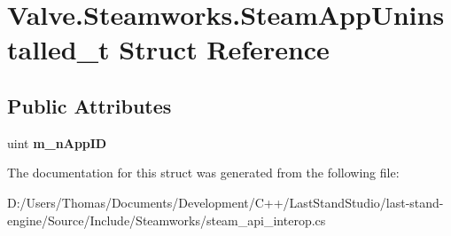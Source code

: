 \hypertarget{structValve_1_1Steamworks_1_1SteamAppUninstalled__t}{}\section{Valve.\+Steamworks.\+Steam\+App\+Uninstalled\+\_\+t Struct Reference}
\label{structValve_1_1Steamworks_1_1SteamAppUninstalled__t}
\subsection*{Public Attributes}
\begin{DoxyCompactItemize}
\item 
\hypertarget{structValve_1_1Steamworks_1_1SteamAppUninstalled__t_ae9404e738915edd6c6f46c6758af19bf}{}uint {\bfseries m\+\_\+n\+App\+I\+D}\label{structValve_1_1Steamworks_1_1SteamAppUninstalled__t_ae9404e738915edd6c6f46c6758af19bf}

\end{DoxyCompactItemize}


The documentation for this struct was generated from the following file\+:\begin{DoxyCompactItemize}
\item 
D\+:/\+Users/\+Thomas/\+Documents/\+Development/\+C++/\+Last\+Stand\+Studio/last-\/stand-\/engine/\+Source/\+Include/\+Steamworks/steam\+\_\+api\+\_\+interop.\+cs\end{DoxyCompactItemize}
